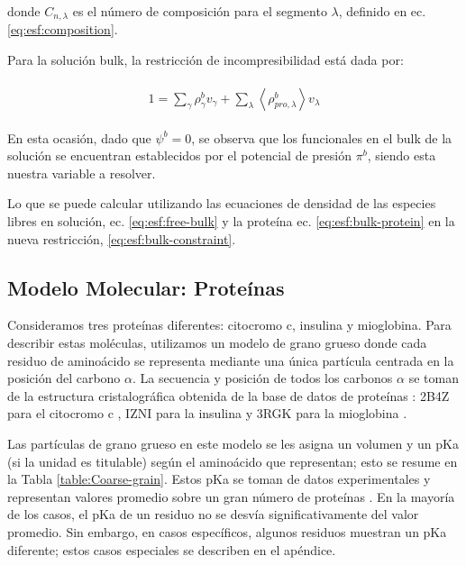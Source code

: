 donde $C_{n,\lambda}$ es el n\'umero de composici\'on para el segmento $\lambda$, definido en ec.  \ref{eq:esf:composition}.

Para la soluci\'on bulk, la restricci\'on de incompresibilidad est\'a dada por:

\begin{align}
	\begin{aligned}
		1= {\sum_{\gamma}\rho^b_\gamma v_\gamma + \sum_\lambda{\left<\rho^b_{pro,\lambda}\right>v_\lambda} }
	\end{aligned}
	\label{eq:esf:bulk-constraint}
\end{align}


En esta ocasi\'on, dado que $\psi^b = 0$, se observa que los funcionales en el bulk de la soluci\'on se encuentran establecidos por el potencial de presi\'on $\pi^b$, siendo esta nuestra variable a resolver.

Lo que se puede calcular utilizando las ecuaciones de densidad de las especies libres en soluci\'on, ec.  \ref{eq:esf:free-bulk} y la prote\'ina ec. \ref{eq:esf:bulk-protein} en la nueva restricci\'on, \ref{eq:esf:bulk-constraint}.



\subsection{Modelo Molecular: Prote\'inas}\label{subsec:protein}



Consideramos tres prote\'inas diferentes: citocromo c, insulina y mioglobina.
Para describir estas mol\'eculas, utilizamos un modelo de grano grueso donde cada residuo de amino\'acido se representa mediante una \'unica part\'icula centrada en la posici\'on del carbono $\alpha$.
La secuencia y posici\'on de todos los carbonos $\alpha$ se toman de la estructura cristalogr\'afica obtenida de la base de datos de prote\'inas \cite{berman2000protein}: 2B4Z para el citocromo c \cite{mirkin2008high}, IZNI para la insulina \cite{bentley1976structure} y 3RGK para la mioglobina \cite{hubbard1990x}.

Las part\'iculas de grano grueso en este modelo se les asigna un volumen y un pKa (si la unidad es titulable) seg\'un el amino\'acido que representan; esto se resume en la Tabla \ref{table:Coarse-grain}.
Estos pKa se toman de datos experimentales y representan valores promedio sobre un gran n\'umero de prote\'inas \cite{grimsley2009summary}.
En la mayor\'ia de los casos, el pKa de un residuo no se desv\'ia significativamente del valor promedio.
Sin embargo, en casos espec\'ificos, algunos residuos muestran un pKa diferente;
estos casos especiales se describen en el ap\'endice. 






